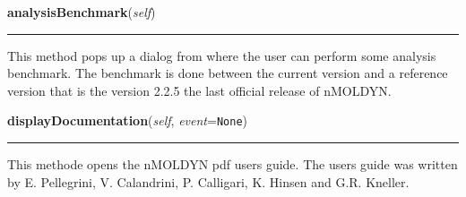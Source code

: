    \vspace{0.5ex}

\hspace{.8\funcindent}\begin{boxedminipage}{\funcwidth}

    \raggedright \textbf{analysisBenchmark}(\textit{self})

    \vspace{-1.5ex}

    \rule{\textwidth}{0.5\fboxrule}
\setlength{\parskip}{2ex}
    This method pops up a dialog from where the user can perform some 
    analysis benchmark. The benchmark is done between the current version 
    and a reference version that is the version 2.2.5 the last official 
    release of nMOLDYN.

\setlength{\parskip}{1ex}
    \end{boxedminipage}

    \label{nMOLDYN:GUI:MainDialog:MainDialog:displayDocumentation}

    \vspace{0.5ex}

\hspace{.8\funcindent}\begin{boxedminipage}{\funcwidth}

    \raggedright \textbf{displayDocumentation}(\textit{self}, \textit{event}={\tt None})

    \vspace{-1.5ex}

    \rule{\textwidth}{0.5\fboxrule}
\setlength{\parskip}{2ex}
    This methode opens the nMOLDYN pdf users guide. The users guide was 
    written by E. Pellegrini, V. Calandrini, P. Calligari, K. Hinsen and 
    G.R. Kneller.

\setlength{\parskip}{1ex}
    \end{boxedminipage}

    \label{nMOLDYN:GUI:MainDialog:MainDialog:displayMailingList}

    \vspace{0.5ex}

